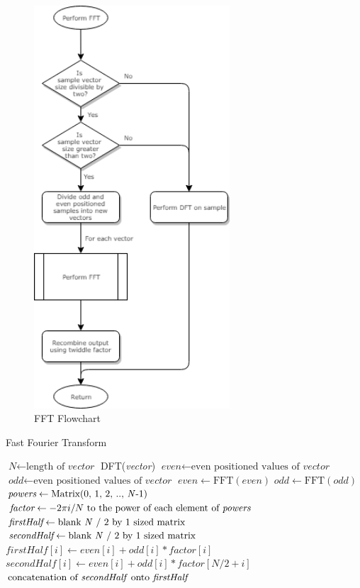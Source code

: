 \documentclass[12pt]{report}
\begin{document}
\begin{figure}[H]
	\centering
	\includegraphics[width=0.65\textwidth]{flow_2.png}
	\caption{FFT Flowchart}\label{fft_flow}
	\centering
\end{figure}

\begin{algorithm}
\caption{Fast Fourier Transform}\label{fft_algo}
\begin{algorithmic}[1]
\State $\textit{N} \gets \text{length of }\textit{vector}$
\Return DFT(\textit{vector})
\Else
\State $\textit{even} \gets \text{even positioned values of }\textit{vector}$
\State $\textit{odd} \gets \text{even positioned values of }\textit{vector}$
\State $\textit{even} \gets \text{FFT}(\textit{even})$
\State $\textit{odd} \gets \text{FFT}(\textit{odd})$
\State $\textit{powers} \gets \text{Matrix}(\text{0, 1, 2, .., \textit{N}-1})$
\State $\textit{factor} \gets -2 \pi i / N  \text{ to the power of each element of \textit{powers}} $
\State $\textit{firstHalf} \gets \text{blank \textit{N} / 2 by 1 sized matrix}$
\State $\textit{secondHalf} \gets \text{blank \textit{N} / 2 by 1 sized matrix}$
\State $\textit{firstHalf}[i] \gets \textit{even}[i] + \textit{odd}[i] * \textit{factor}[i]$
\State $\textit{secondHalf}[i] \gets \textit{even}[i] + \textit{odd}[i] * \textit{factor}[N/2 +i]$
\EndFor
\Return $\text{concatenation of \textit{secondHalf} onto \textit{firstHalf}}$
\EndIf
\EndProcedure
\end{algorithmic}
\end{algorithm}
\end{document}

